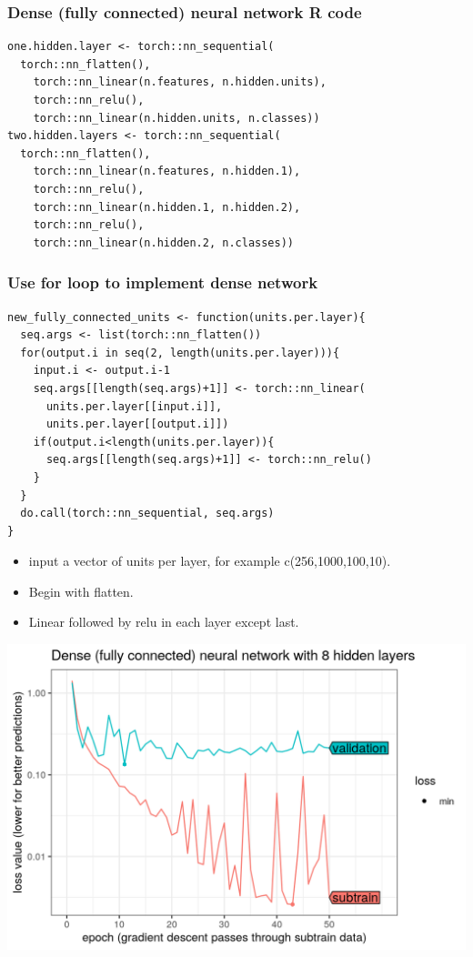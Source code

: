 \documentclass{beamer}
\begin{document}
\begin{frame}[fragile]
  \frametitle{Dense (fully connected) neural network R code}

\begin{verbatim}
one.hidden.layer <- torch::nn_sequential(
  torch::nn_flatten(),
    torch::nn_linear(n.features, n.hidden.units),
    torch::nn_relu(),
    torch::nn_linear(n.hidden.units, n.classes))
two.hidden.layers <- torch::nn_sequential(
  torch::nn_flatten(),
    torch::nn_linear(n.features, n.hidden.1),
    torch::nn_relu(),
    torch::nn_linear(n.hidden.1, n.hidden.2),
    torch::nn_relu(),
    torch::nn_linear(n.hidden.2, n.classes))
\end{verbatim}

\end{frame}

\begin{frame}[fragile]
  \frametitle{Use for loop to implement dense network}
\begin{verbatim}
new_fully_connected_units <- function(units.per.layer){
  seq.args <- list(torch::nn_flatten())
  for(output.i in seq(2, length(units.per.layer))){
    input.i <- output.i-1
    seq.args[[length(seq.args)+1]] <- torch::nn_linear(
      units.per.layer[[input.i]], 
      units.per.layer[[output.i]])
    if(output.i<length(units.per.layer)){
      seq.args[[length(seq.args)+1]] <- torch::nn_relu()
    }
  }
  do.call(torch::nn_sequential, seq.args)
}
\end{verbatim}
  \begin{itemize}
  \item input a vector of units per layer, for example c(256,1000,100,10).
  \item Begin with flatten.
  \item Linear followed by relu in each layer except last.
  \end{itemize}
\end{frame}
 
\begin{frame}
  \includegraphics[width=\textwidth]{figure-validation-loss-dense}
\end{frame}
 
\end{document}
